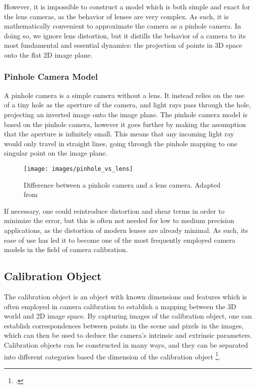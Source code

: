 However, it is impossible to construct a model which is both simple and exact for the lens cameras, as the behavior of lenses are very complex. As such, it is mathematically convenient to approximate the camera as a pinhole camera. In doing so, we ignore lens distortion, but it distills the behavior of a camera to its most fundamental and essential dynamics: the projection of points in 3D space onto the flat 2D image plane. 

\subsubsection{Pinhole Camera Model}

A pinhole camera is a simple camera without a lens. It instead relies on the use of a tiny hole as the aperture of the camera, and light rays pass through the hole, projecting an inverted image onto the image plane. The pinhole camera model is based on the pinhole camera, however it goes further by making the assumption that the aperture is infinitely small. This means that any incoming light ray would only travel in straight lines, going through the pinhole mapping to one singular point on the image plane. 

\begin{figure}[H]
    \centering
    \texttt{[image: images/pinhole\_vs\_lens]}
    \caption{Difference between a pinhole camera and a lens camera. Adapted from \cite{leCameraModel2018}}
\end{figure}

If necessary, one could reintroduce distortion and shear terms in order to minimize the error, but this is often not needed for low to medium precision applications, as the distortion of modern lenses are already minimal. As such, its ease of use has led it to become one of the most frequently employed camera models in the field of camera calibration. 

\subsection{Calibration Object}

The calibration object is an object with known dimensions and features which is often employed in camera calibration to establish a mapping between the 3D world and 2D image space. By capturing images of the calibration object, one can establish correspondences between points in the scene and pixels in the images, which can then be used to deduce the camera's intrinsic and extrinsic parameters. Calibration objects can be constructed in many ways, and they can be separated into different categories based the dimension of the calibration object \footcite{zhangCameraCalibration2007}. 

